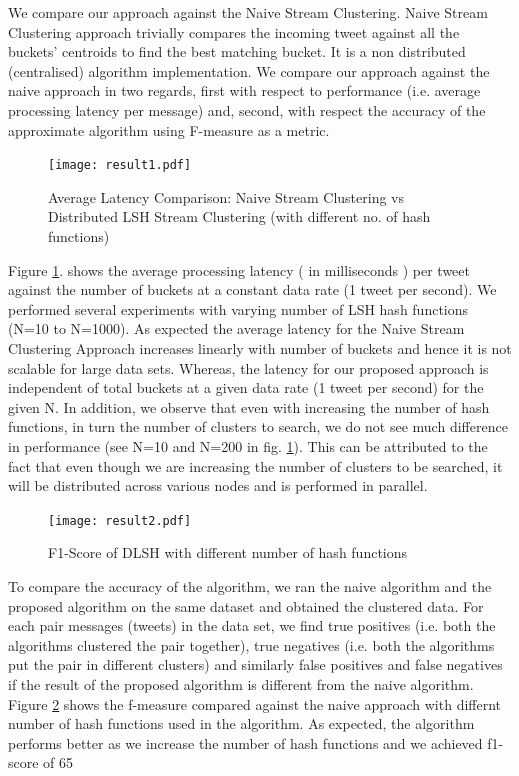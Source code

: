 \documentclass{article} %
\begin{document}
We compare our approach against the Naive Stream Clustering. Naive Stream Clustering approach trivially compares the incoming tweet against all the buckets' centroids to find the best matching bucket. It is a non distributed (centralised) algorithm implementation. We compare our approach against the naive approach in two regards, first with respect to performance (i.e. average processing latency per message) and, second, with respect the accuracy of the approximate algorithm using F-measure as a metric.
\begin{figure}[!ht]
\centering
\texttt{[image: result1.pdf]}
\caption{Average Latency Comparison: Naive Stream Clustering vs Distributed LSH Stream Clustering (with different no. of hash functions)}
\label{fig:result1}
\end{figure}
Figure \ref{fig:result1}. shows the average processing latency ( in milliseconds ) per tweet against the number of buckets at a constant data rate (1 tweet per second). We performed several experiments with varying number of LSH hash functions (N=10 to N=1000). As expected the average latency for the Naive Stream Clustering Approach increases linearly with number of buckets and hence it is not scalable for large data sets. Whereas, the latency for our proposed approach is independent of total buckets at a given data rate (1 tweet per second) for the given N. In addition, we observe that even with increasing the number of hash functions, in turn the number of clusters to search, we do not see much difference in performance (see N=10 and N=200 in fig. \ref{fig:result1}). This can be attributed to the fact that even though we are increasing the number of clusters to be searched, it will be distributed across various nodes and is performed in parallel. 



\begin{figure}[!ht]
\centering
\texttt{[image: result2.pdf]}
\caption{F1-Score of DLSH with different number of hash functions}
\label{fig:result2}
\end{figure}

To compare the accuracy of the algorithm, we ran the naive algorithm and the proposed algorithm on the same dataset and obtained the clustered data. For each pair messages (tweets) in the data set, we find true positives (i.e. both the algorithms clustered the pair together), true negatives (i.e. both the algorithms put the pair in different clusters) and similarly false positives and false negatives if the result of the proposed algorithm is different from the naive algorithm. Figure \ref{fig:result2} shows the f-measure compared against the naive approach with differnt number of hash functions used in the algorithm. As expected, the algorithm performs better as we increase the number of hash functions and we achieved f1-score of 65%
\end{document}

